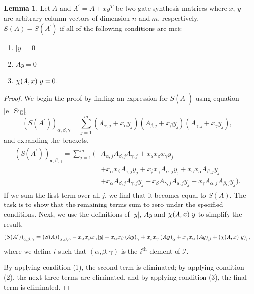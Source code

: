 \documentclass{article}
\theoremstyle{definition}
\theoremstyle{problem}
\theoremstyle{lemma}
\newtheorem{lemma}{Lemma}[section]
\begin{document}
		\theoremstyle{lemma}
		\begin{lemma}{}
			\label{lem1}
			Let $A$ and $A^\prime = A + xy^T$ be two gate synthesis matrices where $x$, $y$ are arbitrary column vectors of dimension $n$ and $m$, respectively. $S(A) = S(A^\prime)$ if all of the following conditions are met:
			\begin{enumerate}
				\item $|y| = 0$
				\item $Ay = 0$
				\item $\chi(A,x)\hspace{1mm}y = 0$.
			\end{enumerate}
		\end{lemma}
		\begin{proof}
			We begin the proof by finding an expression for $S(A^\prime)$ using equation \ref{e_Sig},
			\begin{equation}
			\left(S(A^\prime)\right)_{\alpha,\beta,\gamma} = \sum_{j=1}^{m}\left(A_{\alpha,j}+x_\alpha y_j\right)\left(A_{\beta,j}+x_\beta y_j\right)\left(A_{\gamma,j}+x_\gamma y_j\right),
			\end{equation}
			and expanding the brackets,
			\begin{align}
			\label{e_working1}
			\begin{split}
			\left(S(A^\prime)\right)_{\alpha,\beta,\gamma} = \sum_{j=1}^{m}(&A_{\alpha,j}A_{\beta,j}A_{\gamma,j} + x_\alpha x_\beta x_\gamma y_j  \\			
			&+ x_\alpha x_\beta A_{\gamma,j} y_j + x_\beta x_\gamma A_{\alpha,j} y_j + x_\gamma x_\alpha A_{\beta,j} y_j \\
			&+ x_\alpha A_{\beta,j} A_{\gamma,j} y_j + x_\beta A_{\gamma,j} A_{\alpha,j} y_j + x_\gamma A_{\alpha,j} A_{\beta,j} y_j).
			\end{split}
			\end{align}
			If we sum the first term over all $j$, we find that it becomes equal to $S(A)$. The task is to show that the remaining terms sum to zero under the specified conditions. Next, we use the definitions of $|y|$, $Ay$ and $\chi(A,x)\hspace{1mm}y$ to simplify the result,
			\begin{equation}
			\left(S(A^\prime)\right)_{\alpha,\beta,\gamma} = \left(S(A)\right)_{\alpha,\beta,\gamma} + x_\alpha x_\beta x_\gamma |y| + x_\alpha x_\beta \left(Ay\right)_\gamma + x_\beta x_\gamma \left(Ay\right)_\alpha + x_\gamma x_\alpha \left(Ay\right)_\beta + \left(\chi(A,x)\hspace{1mm}y\right)_i,
			\end{equation}
			where we define $i$ such that $(\alpha,\beta,\gamma)$ is the $i^\text{th}$ element of $\mathcal{I}$.
			
			By applying condition (1), the second term is eliminated; by applying condition (2), the next three terms are eliminated, and by applying condition (3), the final term is eliminated.
		\end{proof}
	
\end{document}
